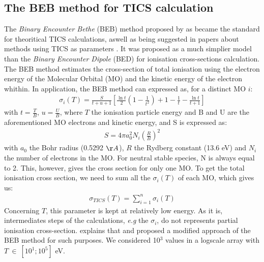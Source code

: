 \documentclass[article,preview]{planetary}
\begin{document}
\subsection{The BEB method for TICS calculation} 
The \textit{Binary Encounter Bethe} (BEB) method proposed by \textcite{kimBinaryencounterdipoleModelElectronimpact1994} as became the standard for theoritical TICS calculations, aswell as being suggested in papers about methods using TICS as parameters \parencites{gautier}. It was proposed as a much simplier model than the \textit{Binary Encounter Dipole} (BED) for ionisation cross-sections calculation. The BEB method estimates the cross-section of total ionisation using the electron energy of the Molecular Orbital (MO) and the kinetic energy of the electron whithin. In application, the BEB method can expressed as, for a distinct MO $i$:
\begin{align}
    \sigma_{i}(T) = \frac{S}{t+u+1} \left[\frac{\ln t}{2} \left(1-\frac{1}{t^2}\right)+1-\frac{1}{t}-\frac{\ln t}{t+1}\right] \label{eq:beb}
\end{align}
with $t=\frac{T}{B}$, $u=\frac{U}{B}$, where $T$ the ionisation particle energy and B and U are the  aforementioned MO electrons and kinetic energy, and S is expressed as:
\begin{align}
    S = 4\pi a_0^2N_i\left(\frac{R}{B}\right)^2 \label{eq:S}
\end{align}
with $a_0$ the Bohr radius (0.5292 $\AA$), $R$ the Rydberg constant (13.6 eV) and $N_i$ the number of electrons in the MO. For neutral stable species, N is always equal to 2. This, however, gives the cross section for only one MO. To get the total ionisation cross section, we need to sum all the $\sigma_i(T)$ of each MO, which gives us:
\begin{align}
    \sigma_{TICS}(T) = \sum^n_{i=1} \sigma_i(T)
\end{align}
Concerning $T$, this parameter is kept at relatively low energy. As it is, intermediates steps of the calculations, \textit{e.g} the $\sigma_i$, do not represents partial ionisation cross-section. \textcite{jesenekPartialIonisationCross2025} explains that and proposed a modified approach of the BEB method for such purposes. We considered 10$^3$ values in a logscale array with $T~\in~[10^1;10^5]$ eV.  
\end{document}
